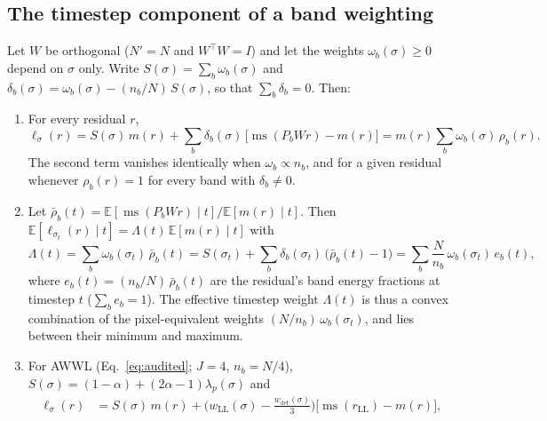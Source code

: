 \subsection{The timestep component of a band weighting}
\label{app:confound}

\begin{proposition}
\label{prop:confound}
Let $W$ be orthogonal ($N' = N$ and $W^\top W = I$) and let the weights
$\omega_b(\sigma) \ge 0$ depend on $\sigma$ only. Write $S(\sigma) = \sum_b \omega_b(\sigma)$ and
$\delta_b(\sigma) = \omega_b(\sigma) - (n_b/N)\,S(\sigma)$, so that
$\sum_b \delta_b = 0$. Then:
\begin{enumerate}
  \item[(a)] For every residual $r$,
  \begin{equation}
    \ell_\sigma(r)
    = S(\sigma)\, m(r)
    + \sum_b \delta_b(\sigma)\,\big[\operatorname{ms}(P_b W r) - m(r)\big]
    = m(r) \sum_b \omega_b(\sigma)\,\rho_b(r) .
    \label{eq:shape-decomp}
  \end{equation}
  The second term vanishes identically when $\omega_b \propto n_b$, and for a
  given residual whenever $\rho_b(r) = 1$ for every band with
  $\delta_b \neq 0$.
  \item[(b)] Let
  $\bar\rho_b(t) = \mathbb{E}[\operatorname{ms}(P_b W r) \mid t]/\mathbb{E}[m(r) \mid t]$.
  Then $\mathbb{E}[\ell_{\sigma_t}(r) \mid t] = \Lambda(t)\,\mathbb{E}[m(r) \mid t]$ with
  \begin{equation}
    \Lambda(t) = \sum_b \omega_b(\sigma_t)\,\bar\rho_b(t)
    = S(\sigma_t) + \sum_b \delta_b(\sigma_t)\,\big(\bar\rho_b(t) - 1\big)
    = \sum_b \frac{N}{n_b}\,\omega_b(\sigma_t)\, e_b(t),
    \label{eq:eff-weight}
  \end{equation}
  where $e_b(t) = (n_b/N)\,\bar\rho_b(t)$ are the residual's band energy
  fractions at timestep $t$ ($\sum_b e_b = 1$). The effective timestep weight
  $\Lambda(t)$ is thus a convex combination of the pixel-equivalent weights
  $(N/n_b)\,\omega_b(\sigma_t)$, and lies between their minimum and maximum.
  \item[(c)] For AWWL (Eq.~\eqref{eq:audited}; $J = 4$, $n_b = N/4$),
  $S(\sigma) = (1-\alpha) + (2\alpha-1)\lambda_p(\sigma)$ and
  \begin{align}
    \ell_\sigma(r) &= S(\sigma)\, m(r)
      + \Big(w_{\mathrm{LL}}(\sigma) - \frac{w_{\det}(\sigma)}{3}\Big)
        \big[\operatorname{ms}(r_{\mathrm{LL}}) - m(r)\big],
    \label{eq:awwl-decomp}\\

\end{align}
\end{enumerate}
\end{proposition}
